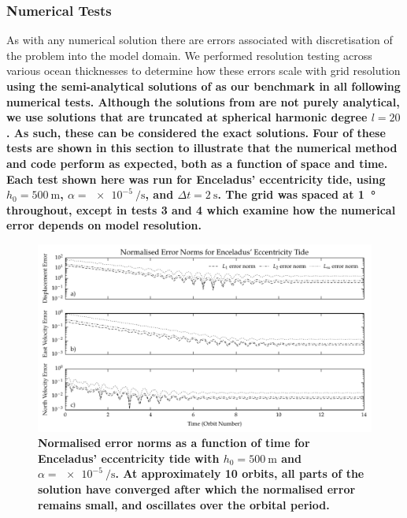 \subsubsection{\textbf{Numerical Tests} \label{subsubsec:num_test}}

As with any numerical solution there are errors associated with discretisation of the problem into the model domain. We performed resolution testing across various ocean thicknesses to determine how these errors scale with grid resolution \textbf{using the semi-analytical solutions of \citet{matsuyama2014tidal} as our benchmark in all following numerical tests. Although the solutions from \citet{matsuyama2014tidal} are not purely analytical, we use solutions that are truncated at spherical harmonic degree $l=20$. As such, these can be considered the exact solutions. Four of these tests are shown in this section to illustrate that the numerical method and code perform as expected, both as a function of space and time. Each test shown here was run for Enceladus' eccentricity tide, using $h_0 = \SI{500}{\metre}$, $\alpha = \SI{e-5}{\per\second}$, and $\Delta t = \SI{2}{\second}$. The grid was spaced at \SI{1}{\degree} throughout, except in tests 3 and 4 which examine how the numerical error depends on model resolution.}

\begin{figure}[t]
\centering
\includegraphics[width=\linewidth]{Figures/temporal_error_ecc}
\caption{\textbf{Normalised error norms as a function of time for Enceladus' eccentricity tide with $h_0 = \SI{500}{\metre}$ and $\alpha = \SI{e-5}{\per\second}$. At approximately \num{10} orbits, all parts of the solution have converged after which the normalised error remains small, and oscillates over the orbital period.} \label{fig:temporal_error}}
\end{figure}


